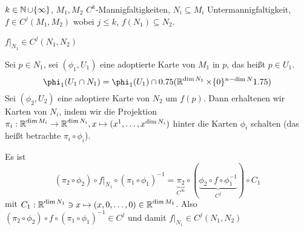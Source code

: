 \begin{Loes}
$k \in \operatorname{\mathbb{N}} \cup \{\infty\}$, $M_1, M_2$ $C^k$-Mannigfaltigkeiten, $N_i \subseteq M_i$ Untermannigfaltigkeit, $f \in C^j(M_1, M_2)$ wobei $j \le k$, $f(N_1) \subseteq N_2$.
\begin{description}[font=\normalfont\itshape]
\item[Behauptung:]
	$f|_{N_1} \in C^j(N_1, N_2)$
\item[Beweis:]
	Sei $p \in N_1$, sei $(\phi_1, U_1)$ eine adoptierte Karte von $M_1$ in $p$, das hei\ss t $p \in U_1$.
		\[ \phi_1(U_1 \cap N_1) = \phi_1(U_1) \cap \left(\R^{\dim N_1} \times \{0\}^{n-\dim N}\right) \]
	Sei $(\phi_2, U_2)$ eine adoptiere Karte von $N_2$ um $f(p)$. Dann erhaltenen wir Karten von $N_i$, indem wir die Projektion $\pi_i: \operatorname{\mathbb{R}}^{\dim M_i} \to \operatorname{\mathbb{R}}^{\dim N_i}, x \mapsto (x^1,\ldots ,x^{\dim N_i})$ hinter die Karten $\phi_i$ schalten (das hei\ss t betrachte $\pi_i \circ \phi_i$).
	
	Es ist
		\[(\pi_2 \circ \phi_2) \circ f|_{N_1} \circ (\pi_1 \circ \phi_1)^{-1} = \underbrace{\pi_2}_{C^\infty} \circ (\underbrace{\phi_2 \circ f \circ \phi_1^{-1}}_{C^j}) \circ C_1\]
	mit $C_1: \operatorname{\mathbb{R}}^{\dim N_1} \ni x \mapsto (x, 0,\ldots ,0) \in \operatorname{\mathbb{R}}^{\dim M_1}$. Also $(\pi_2 \circ \phi_2) \circ f \circ (\pi_1 \circ \phi_1)^{-1} \in C^j$ und damit $f|_{N_1} \in C^j(N_1, N_2)$
\end{description}
\end{Loes}

